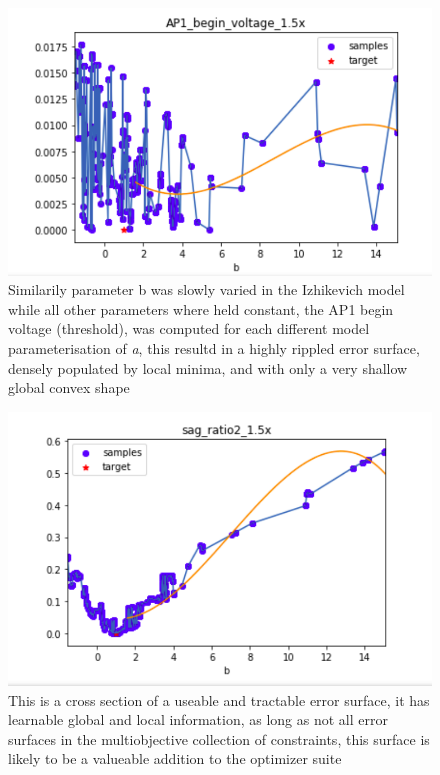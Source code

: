 \begin{figure}
\centering
      \includegraphics[scale=0.85]{figures/parameter_b_hopeless_surface.png}
      \caption[Something]{Similarily parameter b was slowly varied in the Izhikevich model while all other parameters where held constant, the AP1 begin voltage (threshold), was computed for each different model parameterisation of \emph{a}, this resultd in a highly rippled error surface, densely populated by local minima, and with only a very shallow global convex shape}
      \label{fig:probably_smooth_constraint}
\end{figure}

\begin{figure}      
\centering
      \includegraphics[scale=0.85]{figures/parameter_b_friendly_surface.png}
      \caption[Something]{This is a cross section of a useable and tractable error surface, it has learnable global and local information, as long as not all error surfaces in the multiobjective collection of constraints, this surface is likely to be a valueable addition to the optimizer suite}
      \label{fig:test2}
\end{figure}


